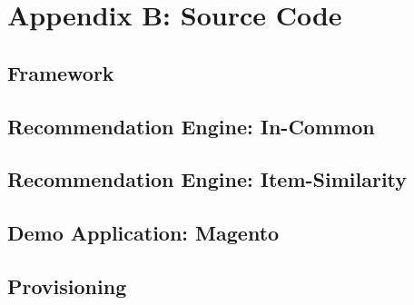 \chapter*{Appendix B: Source Code}

\section{Framework}

\section{Recommendation Engine: In-Common}

\section{Recommendation Engine: Item-Similarity}

\section{Demo Application: Magento}

\section{Provisioning}
